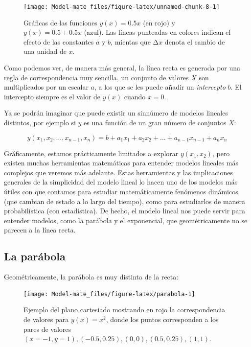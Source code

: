 \documentclass[
]{book}
\begin{document}
\begin{figure}

{\centering \texttt{[image: Model-mate\_files/figure-latex/unnamed-chunk-8-1]} 

}

\caption{Gráficas de las funciones $y(x) = 0.5 x$ (en rojo) y $y(x) = 0.5 + 0.5 x$ (azul). Las líneas punteadas en colores indican el efecto de las constantes $a$ y $b$, mientas que Δ$x$ denota el cambio de una unidad de $x$.}\label{fig:unnamed-chunk-8}
\end{figure}

Como podemos ver, de manera más general, la línea recta es generada por una regla de correspondencia muy sencilla, un conjunto de valores \(X\) son multiplicados por un escalar \(a\), a los que se les puede añadir un \emph{intercepto} \(b\). El intercepto siempre es el valor de \(y(x)\) cuando \(x = 0\).

Ya se podrán imaginar que puede existir un sinnúmero de modelos lineales distintos, por ejemplo si \(y\) es una función de un gran número de conjuntos \(X\):

\begin{equation}
y(x_1, x_2, \dots, x_{n-1}, x_n) = b + a_1 x_1 + a_2 x_2 + \dots + a_{n-1} x_{n-1} + a_n x_n
\end{equation}

Gráficamente, estamos prácticamente limitados a explorar \(y(x_1, x_2)\), pero existen muchas herramientas matemáticas para entender modelos lineales más complejos que veremos más adelante. Estas herramientas y las implicaciones generales de la simplicidad del modelo lineal lo hacen uno de los modelos más útiles con que contamos para estudiar matemáticamente fenómenos dinámicos (que cambian de estado a lo largo del tiempo), como para estudiarlos de manera probabilística (con estadística). De hecho, el modelo lineal nos puede servir para entender modelos, como la parábola y el exponencial, que geométricamente no se parecen a la línea recta.

\hypertarget{la-paruxe1bola}{%
\subsection{La parábola}\label{la-paruxe1bola}}

Geométricamente, la parábola es muy distinta de la recta:

\begin{figure}

{\centering \texttt{[image: Model-mate\_files/figure-latex/parabola-1]} 

}

\caption{Ejemplo del plano cartesiado mostrando en rojo la correspondencia de valores para $y(x) = x^2$, donde los puntos corresponden a los pares de valores $(x = -1, y = 1), (-0.5, 0.25), (0, 0), (0.5, 0.25), (1, 1)$.}\label{fig:parabola}
\end{figure}
\end{document}
